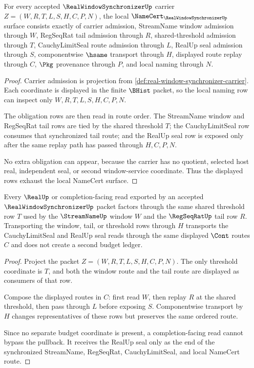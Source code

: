 \begin{theorem}
\label{thm:real-window-synchronizer-namecert-obligations}
For every accepted $\RealWindowSynchronizerUp$ carrier $Z=(W,R,T,L,S,H,C,P,N)$, the local $\NameCert_{\RealWindowSynchronizerUp}$ surface consists exactly of carrier admission, StreamName window admission through $W$, RegSeqRat tail admission through $R$, shared-threshold admission through $T$, CauchyLimitSeal route admission through $L$, RealUp seal admission through $S$, componentwise $\hsame$ transport through $H$, displayed route replay through $C$, $\Pkg$ provenance through $P$, and local naming through $N$.
\end{theorem}
\begin{proof}
Carrier admission is projection from \autoref{def:real-window-synchronizer-carrier}. Each coordinate is displayed in the finite $\BHist$ packet, so the local naming row can inspect only $W,R,T,L,S,H,C,P,N$.

The obligation rows are then read in route order. The StreamName window and RegSeqRat tail rows are tied by the shared threshold $T$; the CauchyLimitSeal row consumes that synchronized tail route; and the RealUp seal row is exposed only after the same replay path has passed through $H,C,P,N$.

No extra obligation can appear, because the carrier has no quotient, selected host real, independent seal, or second window-service coordinate. Thus the displayed rows exhaust the local NameCert surface.
\end{proof}

\begin{theorem}
\label{thm:real-window-synchronizer-budget-pullback}
Every $\RealUp$ or completion-facing read exported by an accepted $\RealWindowSynchronizerUp$ packet factors through the same shared threshold row $T$ used by the $\StreamNameUp$ window $W$ and the $\RegSeqRatUp$ tail row $R$. Transporting the window, tail, or threshold rows through $H$ transports the CauchyLimitSeal and RealUp seal reads through the same displayed $\Cont$ routes $C$ and does not create a second budget ledger.
\end{theorem}
\begin{proof}
Project the packet $Z=(W,R,T,L,S,H,C,P,N)$. The only threshold coordinate is $T$, and both the window route and the tail route are displayed as consumers of that row.

Compose the displayed routes in $C$: first read $W$, then replay $R$ at the shared threshold, then pass through $L$ before exposing $S$. Componentwise transport by $H$ changes representatives of these rows but preserves the same ordered route.

Since no separate budget coordinate is present, a completion-facing read cannot bypass the pullback. It receives the RealUp seal only as the end of the synchronized StreamName, RegSeqRat, CauchyLimitSeal, and local NameCert route.
\end{proof}

